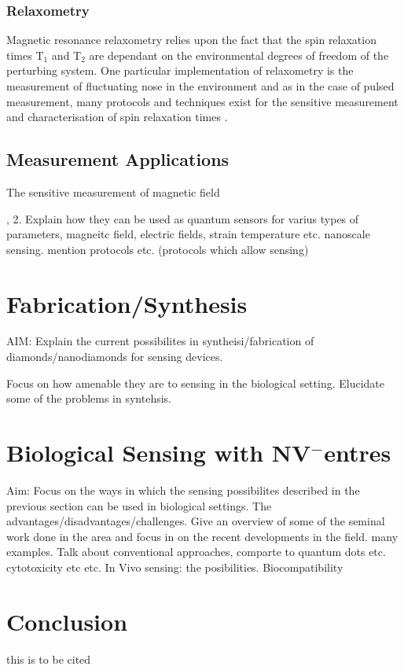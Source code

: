 \documentclass[12pt]{article}
\begin{document}
\subsubsection{Relaxometry}
Magnetic resonance relaxometry relies upon the fact that the spin relaxation times T$_1$ and T$_2$ are dependant on the environmental degrees of freedom of the perturbing system. One particular implementation of relaxometry is the measurement of fluctuating nose in the environment and as in the case of pulsed measurement, many protocols and techniques exist for the sensitive measurement and characterisation of spin relaxation times \cite{steinert2013magnetic}.

\subsection{Measurement Applications}

The sensitive measurement of magnetic field 


,
2. Explain how they can be used as quantum sensors for varius types of parameters, magneitc field, electric fields, strain temperature etc. nanoscale sensing. mention protocols etc. (protocols which allow sensing)


\section{Fabrication/Synthesis}
AIM: Explain the current possibilites in syntheisi/fabrication of diamonds/nanodiamonds for sensing devices. 

Focus on how amenable they are to sensing in the biological setting. Elucidate some of the problems in syntehsis. 

\section{Biological Sensing with NV\texorpdfstring{$^-$} centres}
Aim: Focus on the ways in which the sensing possibilites described in the previous section can be used in biological settings. The advantages/disadvantages/challenges. Give an overview of some of the seminal work done in the area and focus in on the recent developments in the field. many examples. Talk about conventional approaches, comparte to quantum dots etc. cytotoxicity etc etc. In Vivo sensing: the posibilities. Biocompatibility

\section{Conclusion}
this  is to be cited \cite{maletinsky2012robust}

\newpage
\printbibliography
\end{document}
